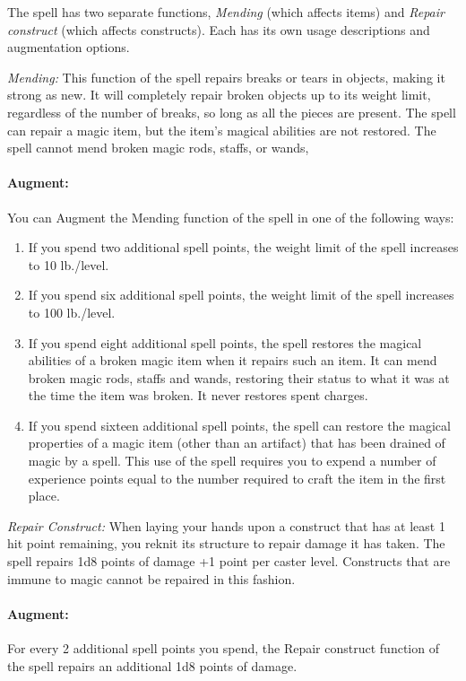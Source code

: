 The spell has two separate functions, \emph{Mending} (which affects items) and \emph{Repair construct} (which affects constructs). 
Each has its own usage descriptions and augmentation options.
\begin{list}{}{\leftmargin=1em}
 \item \emph{Mending:} This function of the spell repairs breaks or tears in objects, making it strong as new. 
It will completely repair broken objects up to its weight limit, regardless of the number of breaks, so long as all the pieces are present.
The spell can repair a magic item, but the item's magical abilities are not restored. 
The spell cannot mend broken magic rods, staffs, or wands,

\paragraph{Augment:} You can Augment the Mending function of the spell in one of the following ways:
\begin{enumerate}
 \item If you spend two additional spell points, the weight limit of the spell increases to 10 lb./level.
 \item If you spend six additional spell points, the weight limit of the spell increases to 100 lb./level.
 \item If you spend eight additional spell points, the spell restores the magical abilities of a broken magic item when it repairs such an item.
 It can mend broken magic rods, staffs and wands, restoring their status to what it was at the time the item was broken. It never restores spent charges.
 \item If you spend sixteen additional spell points, the spell can restore the magical properties of a magic item (other than an artifact) that
 has been drained of magic by a  spell. 
 This use of the spell requires you to expend a number of experience points equal to the number required to craft the item in the first place.
\end{enumerate}
\item \emph{Repair Construct:} When laying your hands upon a construct that has at least 1 hit point remaining, 
you reknit its structure to repair damage it has taken. 
The spell repairs 1d8 points of damage +1 point per caster level. 
Constructs that are immune to magic cannot be repaired in this fashion.

\paragraph{Augment:} For every 2 additional spell points you spend, the Repair construct function of the spell repairs an additional 1d8 points of damage.
\end{list}
